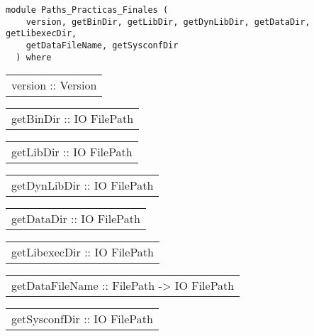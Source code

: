 \label{module:Paths_Practicas_Finales}
\haddockbeginheader
{\haddockverb\begin{verbatim}
module Paths_Practicas_Finales (
    version, getBinDir, getLibDir, getDynLibDir, getDataDir, getLibexecDir,
    getDataFileName, getSysconfDir
  ) where\end{verbatim}}
\haddockendheader

\begin{haddockdesc}
\item[\begin{tabular}{@{}l}
version :: Version
\end{tabular}]
\item[\begin{tabular}{@{}l}
getBinDir :: IO FilePath
\end{tabular}]
\item[\begin{tabular}{@{}l}
getLibDir :: IO FilePath
\end{tabular}]
\item[\begin{tabular}{@{}l}
getDynLibDir :: IO FilePath
\end{tabular}]
\item[\begin{tabular}{@{}l}
getDataDir :: IO FilePath
\end{tabular}]
\item[\begin{tabular}{@{}l}
getLibexecDir :: IO FilePath
\end{tabular}]
\item[\begin{tabular}{@{}l}
getDataFileName :: FilePath -> IO FilePath
\end{tabular}]
\item[\begin{tabular}{@{}l}
getSysconfDir :: IO FilePath
\end{tabular}]
\end{haddockdesc}